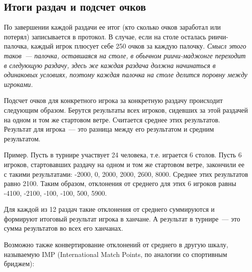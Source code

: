 \subsection{Итоги раздач и подсчет очков}

По завершении каждой раздачи ее итог (кто сколько очков заработал или потерял) записывается в протокол. В случае, если на столе осталась риичи-палочка, каждый игрок плюсует себе 250 очков за каждую палочку. \textit{Смысл этого таков~--- палочка, оставшаяся на столе, в обычном риичи-маджонге переходит в следующую раздачу, здесь же каждая раздача должна начинаться в одинаковых условиях, поэтому каждая палочка на столе делится поровну между игроками.}

\vspace{0.3cm}

Подсчет очков для конкретного игрока за конкретную раздачу происходит следующим образом. Берутся результаты всех игроков, сидевших за этой раздачей на одном и том же стартовом ветре. Считается среднее этих результатов. Результат для игрока~--- это разница между его результатом и средним результатом.

\vspace{0.3cm}

Пример. Пусть в турнире участвует 24 человека, т.е. играется 6 столов. Пусть 6 игроков, стартовавших раздачу на одном и том же стартовом ветре, закончили ее с такими результатами: -2000, 0, 2000, 2000, 2600, 8000. Среднее этих результатов равно 2100. Таким образом, отклонения от среднего для этих 6 игроков равны -4100, -2100, -100, -100, 500, 5900.

\vspace{0.3cm}

Для каждой из 12 раздач такие отклонения от среднего суммируются и формируют итоговый результат игрока в ханчане. А результат в турнире~--- это сумма результатов во всех его ханчанах.

\vspace{0.3cm}

Возможно также конвертирование отклонений от среднего в другую шкалу, называемую IMP (International Match Points, по аналогии со спортивным бриджем):

